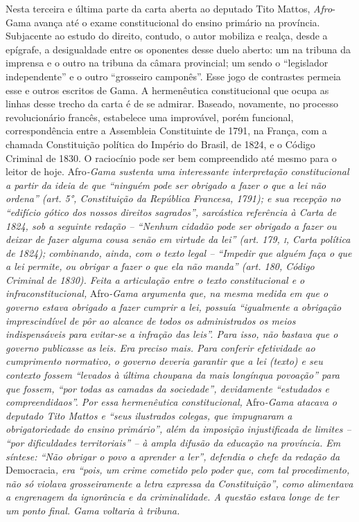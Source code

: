 \begin{didascalia}
Nesta terceira e última parte da carta aberta ao deputado Tito
Mattos,\emph{ Afro}-Gama avança até o exame constitucional do ensino
primário na província. Subjacente ao estudo do direito, contudo, o autor
mobiliza e realça, desde a epígrafe, a desigualdade entre os oponentes
desse duelo aberto: um na tribuna da imprensa e o outro na tribuna da
câmara provincial; um sendo o ``legislador independente'' e o outro
``grosseiro camponês''. Esse jogo de contrastes permeia esse e outros
escritos de Gama. A hermenêutica constitucional que ocupa as linhas
desse trecho da carta é de se admirar. Baseado, novamente, no processo
revolucionário francês, estabelece uma improvável, porém funcional,
correspondência entre a Assembleia Constituinte de 1791, na França, com
a chamada Constituição política do Império do Brasil, de 1824, e o
Código Criminal de 1830. O raciocínio pode ser bem compreendido até
mesmo para o leitor de hoje. Afro\emph{-Gama sustenta uma interessante
interpretação constitucional a partir da ideia de que ``ninguém pode ser
obrigado a fazer o que a lei não ordena'' (art. 5°, Constituição da
República Francesa, 1791); e sua recepção no ``edifício gótico dos nossos
direitos sagrados'', sarcástica referência à Carta de 1824, sob a
seguinte redação -- ``Nenhum cidadão pode ser obrigado a fazer ou deixar
de fazer alguma cousa senão em virtude da lei'' (art. 179, \textsc{i}, Carta
política de 1824); combinando, ainda, com o texto legal -- ``Impedir que
alguém faça o que a lei permite, ou obrigar a fazer o que ela não manda''
(art. 180, Código Criminal de 1830). Feita a articulação entre o texto
constitucional e o infraconstitucional,} Afro\emph{-Gama argumenta que,
na mesma medida em que o governo estava obrigado a fazer cumprir a lei,
possuía ``igualmente a obrigação imprescindível de pôr ao alcance de
todos os administrados os meios indispensáveis para evitar-se a infração
das leis''. Para isso, não bastava que o governo publicasse as leis. Era
preciso mais. Para conferir efetividade ao cumprimento normativo, o
governo deveria garantir que a lei (texto) e seu contexto fossem
``levados à última choupana da mais longínqua povoação'' para que
fossem, ``por todas as camadas da sociedade'', devidamente
``estudados e compreendidaos''. Por essa hermenêutica
constitucional,} Afro\emph{-Gama atacava o deputado Tito Mattos e ``seus
ilustrados colegas, que impugnaram a obrigatoriedade do ensino
primário'', além da imposição injustificada de limites -- ``por
dificuldades territoriais'' -- à ampla difusão da educação na província.
Em síntese: ``Não obrigar o povo a aprender a ler'', defendia o chefe da
redação da} Democracia\emph{, era ``pois, um crime cometido pelo poder
que, com tal procedimento, não só violava grosseiramente a letra
expressa da Constituição'', como alimentava a engrenagem da ignorância e
da criminalidade. A questão estava longe de ter um ponto final. Gama
voltaria à tribuna.}
\end{didascalia}



